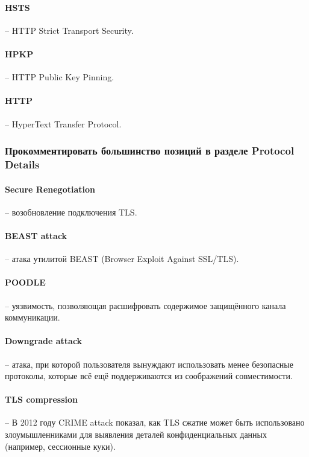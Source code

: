\paragraph{HSTS} -- HTTP Strict Transport Security.

\paragraph{HPKP} -- HTTP Public Key Pinning.

\paragraph{HTTP} -- HyperText Transfer Protocol.

\subsubsection{Прокомментировать большинство позиций в разделе Protocol Details}

\paragraph{Secure Renegotiation} -- возобновление подключения TLS.

\paragraph{BEAST attack} --  атака утилитой BEAST (Browser Exploit Against SSL/TLS).

\paragraph{POODLE} -- уязвимость, позволяющая расшифровать содержимое защищённого канала коммуникации.

\paragraph{Downgrade attack} -- атака, при которой пользователя вынуждают использовать менее безопасные протоколы, которые всё ещё поддерживаются из соображений совместимости.

\paragraph{TLS compression} -- В 2012 году CRIME attack показал, как TLS сжатие может быть использовано злоумышленниками для выявления деталей конфиденциальных данных (например, сессионные куки).

